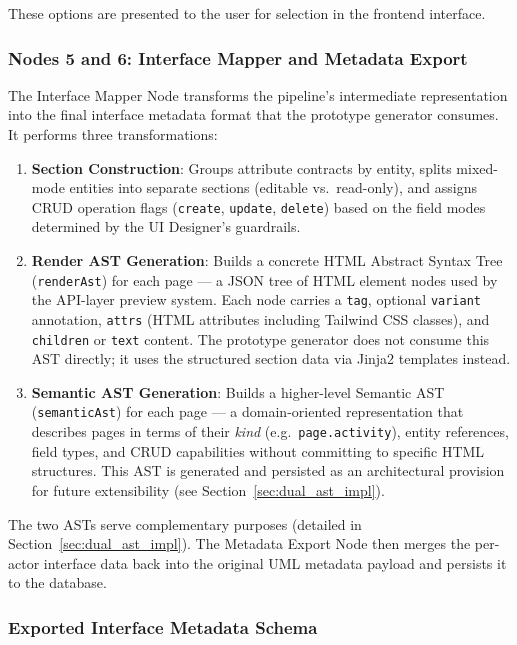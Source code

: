 These options are presented to the user for selection in the frontend interface.


\subsubsection{Nodes 5 and 6: Interface Mapper and Metadata Export}

The Interface Mapper Node transforms the pipeline's intermediate representation into the final interface metadata format that the prototype generator consumes. It performs three transformations:

\begin{enumerate}
    \item \textbf{Section Construction}: Groups attribute contracts by entity, splits mixed-mode entities into separate sections (editable vs.\ read-only), and assigns CRUD operation flags (\texttt{create}, \texttt{update}, \texttt{delete}) based on the field modes determined by the UI Designer's guardrails.
    
    \item \textbf{Render AST Generation}: Builds a concrete HTML Abstract Syntax Tree (\texttt{renderAst}) for each page — a JSON tree of HTML element nodes used by the API-layer preview system. Each node carries a \texttt{tag}, optional \texttt{variant} annotation, \texttt{attrs} (HTML attributes including Tailwind CSS classes), and \texttt{children} or \texttt{text} content. The prototype generator does not consume this AST directly; it uses the structured section data via Jinja2 templates instead.
    
    \item \textbf{Semantic AST Generation}: Builds a higher-level Semantic AST (\texttt{semanticAst}) for each page — a domain-oriented representation that describes pages in terms of their \emph{kind} (e.g.\ \texttt{page.activity}), entity references, field types, and CRUD capabilities without committing to specific HTML structures. This AST is generated and persisted as an architectural provision for future extensibility (see Section~\ref{sec:dual_ast_impl}).
\end{enumerate}

The two ASTs serve complementary purposes (detailed in Section~\ref{sec:dual_ast_impl}). The Metadata Export Node then merges the per-actor interface data back into the original UML metadata payload and persists it to the database.

\subsubsection{Exported Interface Metadata Schema}
\label{sec:interface_schema}


